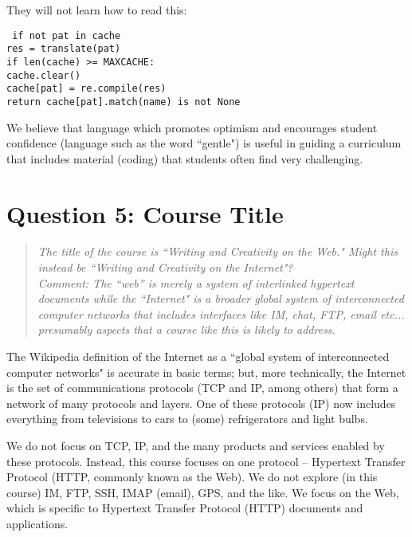 \documentclass[letterpaper,10pt,headsepline]{scrreprt}
\begin{document}
\vspace{10 pt}
They will not learn how to read this:
\vspace{10 pt}

\texttt{
if not pat in cache\\
res = translate(pat)\\
if len(cache) >= MAXCACHE:\\
cache.clear()\\
cache[pat] = re.compile(res)\\
return cache[pat].match(name) is not None\\
}

We believe that language which promotes optimism and encourages student confidence (language such as the word ``gentle") is useful in guiding a curriculum that includes material (coding) that students often find very challenging.

\section{Question 5: Course Title}

\begin{quote}
\textit{The title of the course is ``Writing and Creativity on the Web." Might this instead be ``Writing and Creativity on the Internet"? \\
Comment: The ``web'' is merely a system of interlinked hypertext documents while the ``Internet" is a broader global system of interconnected computer networks that includes interfaces like IM, chat, FTP, email etc...  presumably aspects that a course like this is likely to address.}
\end{quote}

The Wikipedia definition of the Internet as a ``global system of interconnected computer networks" is accurate in basic terms; but, more technically, the Internet is the set of communications protocols (TCP and IP, among others) that form a network of many protocols and layers. One of these protocols (IP) now includes everything from televisions to cars to (some) refrigerators and light bulbs.

We do not focus on TCP, IP, and the many products and services enabled by these protocols. Instead, this course focuses on one protocol --  Hypertext Transfer Protocol (HTTP, commonly known as the Web). We do not explore (in this course) IM, FTP, SSH, IMAP (email), GPS, and the like. We focus on the Web, which is specific to Hypertext Transfer Protocol (HTTP) documents and applications.
\end{document}
